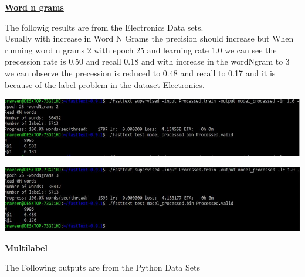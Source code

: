 \documentclass[a4paper,1pt]{article}
\begin{document}
\begin{center}
	\textbf{\underline{Word n grams}}
\end{center}

\noindent The followig results are from the Electronics Data sets.\\

\noindent Usually with increase in Word N Grams the precision should increase but When running word n grams 2 with epoch 25 and learning rate 1.0 we can see the precession rate is 0.50 and recall 0.18 and with increase in the wordNgram to 3 we can observe the precession is reduced to 0.48 and recall to 0.17 and it is  because of  the label problem in the dataset Electronics.



\begin{center}
	\begin{minipage}{\linewidth}
		\centering
		\includegraphics[width=1.0\linewidth]{"Precision and Recall at position 6"}
		
	\end{minipage}
\end{center}

\begin{center}
	\begin{minipage}{\linewidth}
		\centering
		\includegraphics[width=1.0\linewidth]{"Precision and Recall at position 7"}
		
	\end{minipage}
\end{center}

\begin{center}
	\textbf{\underline{Multilabel}}
\end{center}

\noindent The Following outputs are from the Python Data Sets
\end{document}
